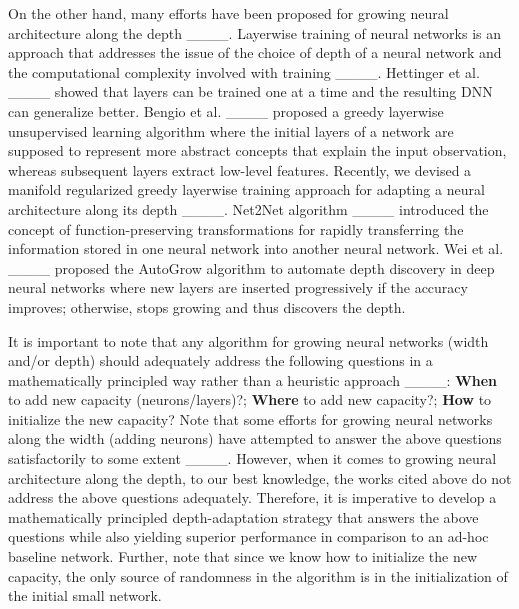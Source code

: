 On the other hand, many efforts have been proposed for growing neural architecture along the depth ____. Layerwise training of neural networks is an approach that addresses the issue of the choice of depth of a neural network and the computational complexity involved with training ____.   Hettinger et al. ____ showed that layers can be trained one at a time and the resulting DNN can generalize better. Bengio et al.  ____ proposed a greedy layerwise unsupervised learning algorithm where the initial layers of a network are supposed to represent more abstract concepts that explain the input observation, whereas subsequent layers extract low-level features. Recently, we devised a manifold regularized greedy layerwise training approach for adapting a neural architecture along its depth ____. Net2Net algorithm ____ introduced the concept of function-preserving transformations for rapidly transferring the information stored in one
neural network into another neural network. Wei et al. ____ proposed the AutoGrow algorithm to automate depth discovery in deep neural networks where new layers are inserted progressively
if the accuracy improves; otherwise, stops growing and
thus discovers the depth.






It is important to note that any algorithm for growing neural networks (width and/or depth) should adequately address the following questions in a mathematically principled way rather than a heuristic approach ____: {\bf{When}} to add new capacity (neurons/layers)?; {\bf{Where}} to add new capacity?; {\bf{How}} to initialize the new capacity? 
Note that some efforts for growing neural networks along the width (adding neurons) have attempted to answer the above questions satisfactorily to some extent ____. However,  when it comes to growing neural architecture along the depth, to our best knowledge, the works cited above do not address the above questions adequately. Therefore, it is imperative to develop a mathematically principled depth-adaptation strategy that answers the above questions while also yielding superior performance in comparison to an ad-hoc baseline network. Further, note that since we know how to initialize the new capacity, the only source of randomness in the algorithm is in the initialization of the initial small network.